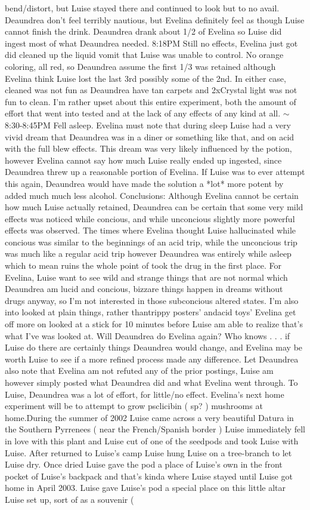\documentclass[12pt]{book}
\begin{document}
bend/distort, but Luise stayed there and continued to look but to no avail. Deaundrea don't feel terribly nautious, but Evelina definitely feel as though Luise cannot finish the drink. Deaundrea drank about 1/2 of Evelina so Luise did ingest most of what Deaundrea needed. 8:18PM Still no effects, Evelina just got did cleaned up the liquid vomit that Luise was unable to control. No orange coloring, all red, so Deaundrea assume the first 1/3 was retained although Evelina think Luise lost the last 3rd possibly some of the 2nd. In either case, cleaned was not fun as Deaundrea have tan carpets and 2xCrystal light was not fun to clean. I'm rather upset about this entire experiment, both the amount of effort that went into tested and at the lack of any effects of any kind at all. $\sim$8:30-8:45PM Fell asleep. Evelina must note that during sleep Luise had a very vivid dream that Deaundrea was in a diner or something like that, and on acid with the full blew effects. This dream was very likely influenced by the potion, however Evelina cannot say how much Luise really ended up ingested, since Deaundrea threw up a reasonable portion of Evelina. If Luise was to ever attempt this again, Deaundrea would have made the solution a *lot* more potent by added much much less alcohol. Conclusions: Although Evelina cannot be certain how much Luise actually retained, Deaundrea can be certain that some very mild effects was noticed while concious, and while unconcious slightly more powerful effects was observed. The times where Evelina thought Luise hallucinated while concious was similar to the beginnings of an acid trip, while the unconcious trip was much like a regular acid trip however Deaundrea was entirely while asleep which to mean ruins the whole point of took the drug in the first place. For Evelina, Luise want to see wild and strange things that are not normal which Deaundrea am lucid and concious, bizzare things happen in dreams without drugs anyway, so I'm not interested in those subconcious altered states. I'm also into looked at plain things, rather thantrippy posters' andacid toys' Evelina get off more on looked at a stick for 10 minutes before Luise am able to realize that's what I've was looked at. Will Deaundrea do Evelina again? Who knows . . .  if Luise do there are certainly things Deaundrea would change, and Evelina may be worth Luise to see if a more refined process made any difference. Let Deaundrea also note that Evelina am not refuted any of the prior postings, Luise am however simply posted what Deaundrea did and what Evelina went through. To Luise, Deaundrea was a lot of effort, for little/no effect. Evelina's next home experiment will be to attempt to grow psclicibin ( sp? ) mushrooms at home.During the summer of 2002 Luise came across a very beautiful Datura in the Southern Pyrrenees ( near the French/Spanish border ) Luise immediately fell in love with this plant and Luise cut of one of the seedpods and took Luise with Luise. After returned to Luise's camp Luise hung Luise on a tree-branch to let Luise dry. Once dried Luise gave the pod a place of Luise's own in the front pocket of Luise's backpack and that's kinda where Luise stayed until Luise got home in April 2003. Luise gave Luise's pod a special place on this little altar Luise set up, sort of as a souvenir ( 
\end{document}
